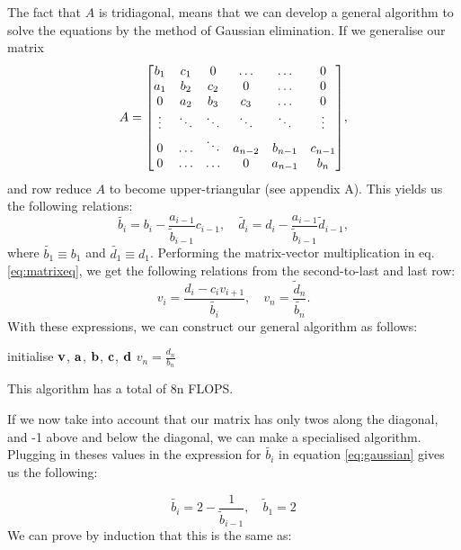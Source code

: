 The fact that $A$ is tridiagonal, means that we can develop a general algorithm
to solve the equations by the method of Gaussian elimination. If we generalise
our matrix
  \[A =
    \mqty[b_1 & c_1 & 0 & \hdots & \hdots & 0 \\
          a_1 & b_2 & c_2 & 0 & \hdots & 0 \\
          0 & a_2 & b_3 & c_3 & \hdots & 0 \\
          \vdots & \ddots & \ddots & \ddots & \ddots & \vdots \\
          0 & \hdots & \ddots & a_{n-2} & b_{n-1} & c_{n-1} \\
          0 & \hdots & \hdots & 0 & a_{n-1} & b_n],
  \]
and row reduce $A$ to become upper-triangular (see appendix A).
This yields us the following relations:
  \begin{equation}  \label{eq:gaussian}
    \widetilde{b_i} = b_i - \frac{a_{i-1}}{\tilde{b}_{i-1}}c_{i-1}, \quad
    \widetilde{d_i} = d_i - \frac{a_{i-1}}{\tilde{b}_{i-1}}\tilde{d}_{i-1},
  \end{equation}
where $\widetilde{b_1} \equiv b_1$ and $\widetilde{d_1} \equiv d_1$.
Performing the matrix-vector multiplication in eq. \ref{eq:matrixeq}, we get
the following relations from the second-to-last and last row:
  \begin{equation}
    v_i = \frac{d_i - c_iv_{i+1}}{\widetilde{b_i}}, \quad
    v_n = \frac{\widetilde{d}_n}{\widetilde{b_n}}.
  \end{equation}
With these expressions, we can construct our general algorithm as follows:
  \begin{algorithm}[h!]
    \SetAlgoLined
    initialise $\vb{v}$, $\vb{a}$, $\vb{b}$, $\vb{c}$, $\vb{d}$\;
    $v_n = \frac{d_n}{b_n}$\;
  \end{algorithm}

This algorithm has a total of 8n FLOPS.

If we now take into account that our matrix has only twos along the diagonal, and -1 above and below the diagonal, we can make a specialised algorithm. Plugging in theses values in the expression for $\widetilde{b_i}$ in equation \ref{eq:gaussian} gives us the following:

	\begin{equation}
	\widetilde{b_i}=2-\frac{1}{\widetilde{b}_{i-1}}, \quad \widetilde{b}_1=2
	\end{equation}
We can prove by induction that this is the same as:

